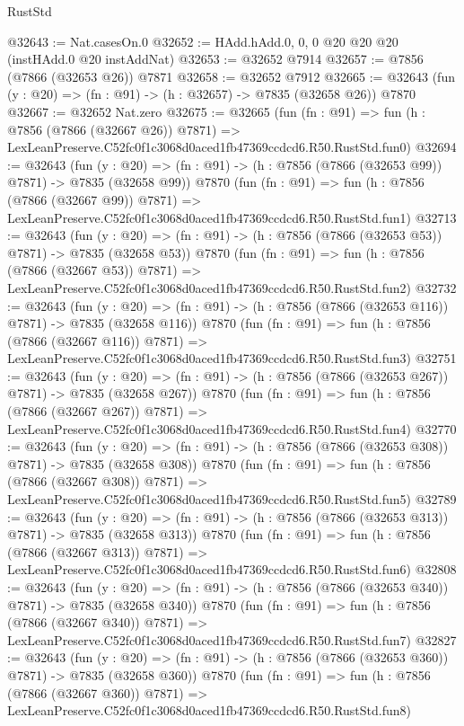 \begin{lexlean}{RustStd}
\begin{coremodule}
@32643 := Nat.casesOn.{0}
@32652 := HAdd.hAdd.{0, 0, 0} @20 @20 @20 (instHAdd.{0} @20 instAddNat)
@32653 := @32652 @7914
@32657 := @7856 (@7866 (@32653 @26)) @7871
@32658 := @32652 @7912
@32665 := @32643 (fun (y : @20) => (fn : @91) -> (h : @32657) -> @7835 (@32658 @26)) @7870
@32667 := @32652 Nat.zero
@32675 := @32665
    (fun (fn : @91) =>
    fun (h : @7856 (@7866 (@32667 @26)) @7871) =>
    LexLeanPreserve.C52fc0f1c3068d0aced1fb47369ccdcd6.R50.RustStd.fun0)
@32694 := @32643
    (fun (y : @20) => (fn : @91) -> (h : @7856 (@7866 (@32653 @99)) @7871) -> @7835 (@32658 @99))
    @7870
    (fun (fn : @91) =>
    fun (h : @7856 (@7866 (@32667 @99)) @7871) =>
    LexLeanPreserve.C52fc0f1c3068d0aced1fb47369ccdcd6.R50.RustStd.fun1)
@32713 := @32643
    (fun (y : @20) => (fn : @91) -> (h : @7856 (@7866 (@32653 @53)) @7871) -> @7835 (@32658 @53))
    @7870
    (fun (fn : @91) =>
    fun (h : @7856 (@7866 (@32667 @53)) @7871) =>
    LexLeanPreserve.C52fc0f1c3068d0aced1fb47369ccdcd6.R50.RustStd.fun2)
@32732 := @32643
    (fun (y : @20) => (fn : @91) -> (h : @7856 (@7866 (@32653 @116)) @7871) -> @7835 (@32658 @116))
    @7870
    (fun (fn : @91) =>
    fun (h : @7856 (@7866 (@32667 @116)) @7871) =>
    LexLeanPreserve.C52fc0f1c3068d0aced1fb47369ccdcd6.R50.RustStd.fun3)
@32751 := @32643
    (fun (y : @20) => (fn : @91) -> (h : @7856 (@7866 (@32653 @267)) @7871) -> @7835 (@32658 @267))
    @7870
    (fun (fn : @91) =>
    fun (h : @7856 (@7866 (@32667 @267)) @7871) =>
    LexLeanPreserve.C52fc0f1c3068d0aced1fb47369ccdcd6.R50.RustStd.fun4)
@32770 := @32643
    (fun (y : @20) => (fn : @91) -> (h : @7856 (@7866 (@32653 @308)) @7871) -> @7835 (@32658 @308))
    @7870
    (fun (fn : @91) =>
    fun (h : @7856 (@7866 (@32667 @308)) @7871) =>
    LexLeanPreserve.C52fc0f1c3068d0aced1fb47369ccdcd6.R50.RustStd.fun5)
@32789 := @32643
    (fun (y : @20) => (fn : @91) -> (h : @7856 (@7866 (@32653 @313)) @7871) -> @7835 (@32658 @313))
    @7870
    (fun (fn : @91) =>
    fun (h : @7856 (@7866 (@32667 @313)) @7871) =>
    LexLeanPreserve.C52fc0f1c3068d0aced1fb47369ccdcd6.R50.RustStd.fun6)
@32808 := @32643
    (fun (y : @20) => (fn : @91) -> (h : @7856 (@7866 (@32653 @340)) @7871) -> @7835 (@32658 @340))
    @7870
    (fun (fn : @91) =>
    fun (h : @7856 (@7866 (@32667 @340)) @7871) =>
    LexLeanPreserve.C52fc0f1c3068d0aced1fb47369ccdcd6.R50.RustStd.fun7)
@32827 := @32643
    (fun (y : @20) => (fn : @91) -> (h : @7856 (@7866 (@32653 @360)) @7871) -> @7835 (@32658 @360))
    @7870
    (fun (fn : @91) =>
    fun (h : @7856 (@7866 (@32667 @360)) @7871) =>
    LexLeanPreserve.C52fc0f1c3068d0aced1fb47369ccdcd6.R50.RustStd.fun8)

\end{coremodule}
\end{lexlean}
